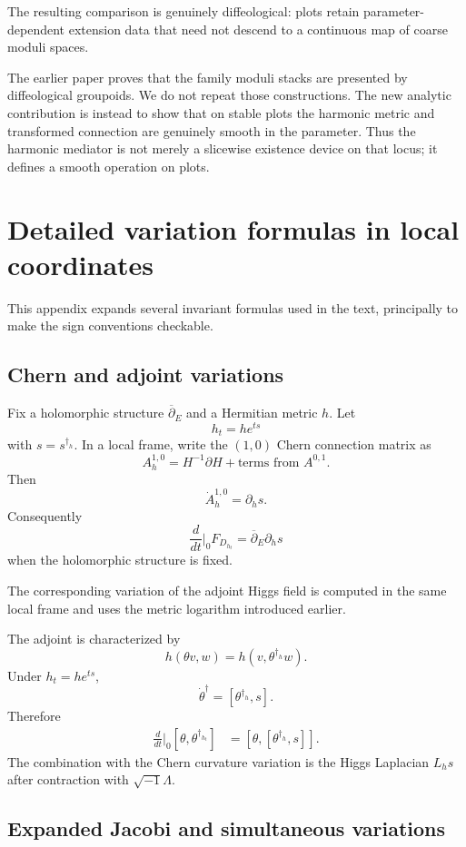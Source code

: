 \documentclass[11pt,reqno]{amsart}
\theoremstyle{definition}
\theoremstyle{remark}
\newcommand{\ddbar}{\overline\partial}
\begin{document}
The resulting comparison is genuinely diffeological: plots retain parameter-dependent extension data that need not descend to a continuous map of coarse moduli spaces.


The earlier paper proves that the family moduli stacks are presented by diffeological groupoids.  We do not repeat those constructions.  The new analytic contribution is instead to show that on stable plots the harmonic metric and transformed connection are genuinely smooth in the parameter.  Thus the harmonic mediator is not merely a slicewise existence device on that locus; it defines a smooth operation on plots.

\section{Detailed variation formulas in local coordinates}\label{app:local-formulas}

This appendix expands several invariant formulas used in the text, principally to make the sign conventions checkable.

\subsection{Chern and adjoint variations}

Fix a holomorphic structure $\ddbar_E$ and a Hermitian metric $h$.  Let
\[
  h_t=he^{ts}
\]
with $s=s^{\dagger_h}$.  In a local frame, write the $(1,0)$ Chern connection matrix as
\[
  A_h^{1,0}=H^{-1}\partial H+\text{terms from }A^{0,1}.
\]
Then
\[
  \dot A_h^{1,0}=\partial_hs.
\]
Consequently
\[
  \frac d{dt}\bigg|_0F_{D_{h_t}}
  =\ddbar_E\partial_hs
\]
when the holomorphic structure is fixed.


The corresponding variation of the adjoint Higgs field is computed in the same local frame and uses the metric logarithm introduced earlier.


The adjoint is characterized by
\[
  h(\theta v,w)=h(v,\theta^{\dagger_h}w).
\]
Under $h_t=he^{ts}$,
\[
  \dot\theta^{\dagger}
  =[\theta^{\dagger_h},s].
\]
Therefore
\begin{align*}
  \frac d{dt}\bigg|_0[\theta,\theta^{\dagger_{h_t}}]
  &=[\theta,[\theta^{\dagger_h},s]].
\end{align*}
The combination with the Chern curvature variation is the Higgs Laplacian $L_hs$ after contraction with $\sqrt{-1}\Lambda$.

\subsection{Expanded Jacobi and simultaneous variations}
\end{document}
